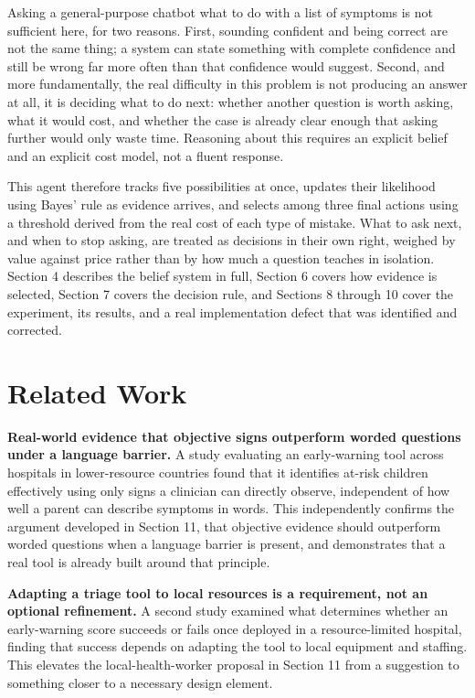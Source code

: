 \documentclass{article}
\begin{document}
Asking a general-purpose chatbot what to do with a list of symptoms is
not sufficient here, for two reasons. First, sounding confident and
being correct are not the same thing; a system can state something with
complete confidence and still be wrong far more often than that
confidence would suggest. Second, and more fundamentally, the real
difficulty in this problem is not producing an answer at all, it is
deciding what to do next: whether another question is worth asking, what
it would cost, and whether the case is already clear enough that asking
further would only waste time. Reasoning about this requires an explicit
belief and an explicit cost model, not a fluent response.

This agent therefore tracks five possibilities at once, updates their
likelihood using Bayes' rule as evidence arrives, and selects among
three final actions using a threshold derived from the real cost of each
type of mistake. What to ask next, and when to stop asking, are treated
as decisions in their own right, weighed by value against price rather
than by how much a question teaches in isolation. Section 4 describes
the belief system in full, Section 6 covers how evidence is selected,
Section 7 covers the decision rule, and Sections 8 through 10 cover the
experiment, its results, and a real implementation defect that was
identified and corrected.

\hypertarget{related-work}{%
\section{Related Work}\label{related-work}}

\textbf{Real-world evidence that objective signs outperform worded
questions under a language barrier.} A study evaluating an early-warning
tool across hospitals in lower-resource countries found that it
identifies at-risk children effectively using only signs a clinician can
directly observe, independent of how well a parent can describe symptoms
in words. This independently confirms the argument developed in Section
11, that objective evidence should outperform worded questions when a
language barrier is present, and demonstrates that a real tool is
already built around that principle.

\textbf{Adapting a triage tool to local resources is a requirement, not
an optional refinement.} A second study examined what determines whether
an early-warning score succeeds or fails once deployed in a
resource-limited hospital, finding that success depends on adapting the
tool to local equipment and staffing. This elevates the
local-health-worker proposal in Section 11 from a suggestion to
something closer to a necessary design element.
\end{document}
